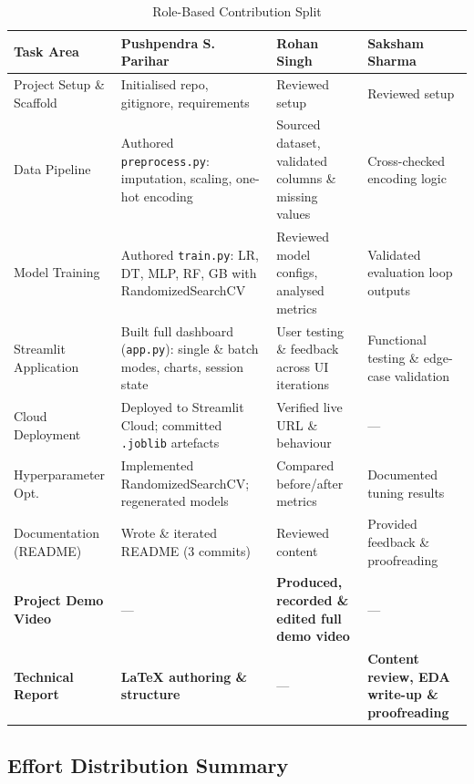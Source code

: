 \documentclass[12pt,a4paper]{article}
\begin{document}
\begin{table}[H]
\centering
\caption{Role-Based Contribution Split}
\begin{tabularx}{\textwidth}{lXXX}
    \toprule
    \textbf{Task Area} & \textbf{Pushpendra S. Parihar} & \textbf{Rohan Singh} & \textbf{Saksham Sharma} \\
    \midrule
    Project Setup \& Scaffold
        & Initialised repo, gitignore, requirements
        & Reviewed setup
        & Reviewed setup \\
    Data Pipeline
        & Authored \texttt{preprocess.py}: imputation, scaling, one-hot encoding
        & Sourced dataset, validated columns \& missing values
        & Cross-checked encoding logic \\
    Model Training
        & Authored \texttt{train.py}: LR, DT, MLP, RF, GB with RandomizedSearchCV
        & Reviewed model configs, analysed metrics
        & Validated evaluation loop outputs \\
    Streamlit Application
        & Built full dashboard (\texttt{app.py}): single \& batch modes, charts, session state
        & User testing \& feedback across UI iterations
        & Functional testing \& edge-case validation \\
    Cloud Deployment
        & Deployed to Streamlit Cloud; committed \texttt{.joblib} artefacts
        & Verified live URL \& behaviour
        & — \\
    Hyperparameter Opt.
        & Implemented RandomizedSearchCV; regenerated models
        & Compared before/after metrics
        & Documented tuning results \\
    Documentation (README)
        & Wrote \& iterated README (3 commits)
        & Reviewed content
        & Provided feedback \& proofreading \\
    \textbf{Project Demo Video}
        & —
        & \textbf{Produced, recorded \& edited full demo video}
        & — \\
    \textbf{Technical Report}
        & \textbf{LaTeX authoring \& structure}
        & —
        & \textbf{Content review, EDA write-up \& proofreading} \\
    \bottomrule
\end{tabularx}
\end{table}


\subsection{Effort Distribution Summary}
\end{document}
